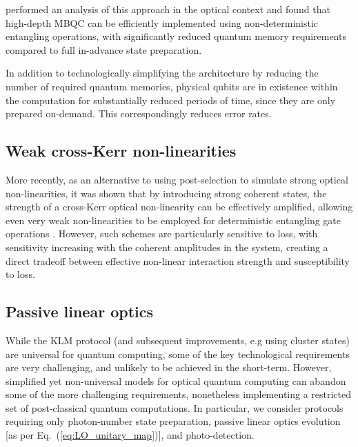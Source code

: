 \cite{KokBuffer} performed an analysis of this approach in the optical context and found that high-depth MBQC can be efficiently implemented using non-deterministic entangling operations, with significantly reduced quantum memory requirements compared to full in-advance state preparation.

In addition to technologically simplifying the architecture by reducing the number of required quantum memories, physical qubits are in existence within the computation for substantially reduced periods of time, since they are only prepared on-demand. This correspondingly reduces error rates.


%
%

\subsection{Weak cross-Kerr non-linearities} 

More recently, as an alternative to using post-selection to simulate strong optical non-linearities, it was shown that by introducing strong coherent states, the strength of a cross-Kerr optical non-linearity can be effectively amplified, allowing even very weak non-linearities to be employed for deterministic entangling gate operations \cite{bib:Munro05}. However, such schemes are particularly sensitive to loss, with sensitivity increasing with the coherent amplitudes in the system, creating a direct tradeoff between effective non-linear interaction strength and susceptibility to loss.


%
%

\subsection{Passive linear optics} \label{sec:passive_LO} 

While the KLM protocol (and subsequent improvements, e.g using cluster states) are universal for quantum computing, some of the key technological requirements are very challenging, and unlikely to be achieved in the short-term. However, simplified yet non-universal models for optical quantum computing can abandon some of the more challenging requirements, nonetheless implementing a restricted set of post-classical quantum computations. In particular, we consider protocols requiring only photon-number state preparation, passive linear optics evolution [as per Eq.~(\ref{eq:LO_unitary_map})], and photo-detection.


